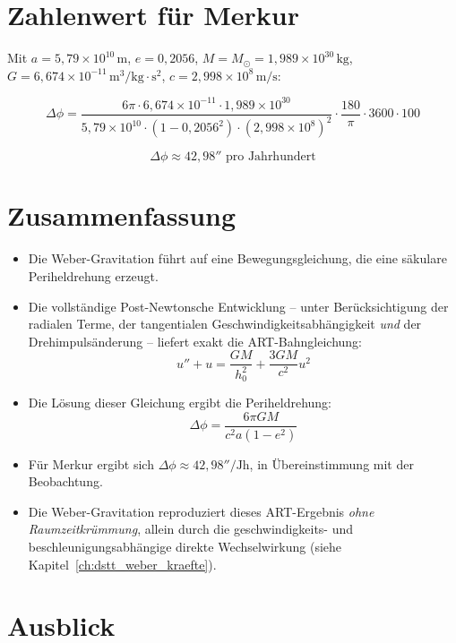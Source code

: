 \section{Zahlenwert für Merkur}
\label{app:periheldrehung_merkur}

Mit \( a = 5,79 \times 10^{10} \, \text{m} \), \( e = 0,2056 \), 
\( M = M_{\odot} = 1,989 \times 10^{30} \, \text{kg} \), 
\( G = 6,674 \times 10^{-11} \, \text{m}^3/\text{kg}\cdot\text{s}^2 \), 
\( c = 2,998 \times 10^8 \, \text{m/s} \):

\[
\Delta\phi = \frac{6\pi \cdot 6,674 \times 10^{-11} \cdot 1,989 \times 10^{30}}
{5,79 \times 10^{10} \cdot (1 - 0,2056^2) \cdot (2,998 \times 10^8)^2} 
\cdot \frac{180}{\pi} \cdot 3600 \cdot 100
\]

\[
\Delta\phi \approx 42,98'' \text{ pro Jahrhundert}
\]

\section{Zusammenfassung}
\label{app:periheldrehung_zusammenfassung}

\begin{itemize}
    \item Die Weber-Gravitation führt auf eine Bewegungsgleichung, die 
          eine säkulare Periheldrehung erzeugt.
    \item Die vollständige Post-Newtonsche Entwicklung – unter 
          Berücksichtigung der radialen Terme, der tangentialen 
          Geschwindigkeitsabhängigkeit \emph{und} der Drehimpulsänderung – 
          liefert exakt die ART-Bahngleichung:
          \[
          u'' + u = \frac{GM}{h_0^2} + \frac{3GM}{c^2} u^2
          \]
    \item Die Lösung dieser Gleichung ergibt die Periheldrehung:
          \[
          \Delta\phi = \frac{6\pi GM}{c^2 a(1-e^2)}
          \]
    \item Für Merkur ergibt sich \( \Delta\phi \approx 42,98''/\text{Jh} \),
          in Übereinstimmung mit der Beobachtung.
    \item Die Weber-Gravitation reproduziert dieses ART-Ergebnis 
          \emph{ohne Raumzeitkrümmung}, allein durch die 
          geschwindigkeits- und beschleunigungsabhängige direkte 
          Wechselwirkung (siehe Kapitel~\ref{ch:dstt_weber_kraefte}).
\end{itemize}

\section{Ausblick}
\label{app:periheldrehung_ausblick}

